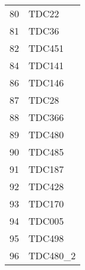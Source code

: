 \begin{table}[ht]
\begin{tabular}{rl}
   80 & TDC22 \\ 
   81 & TDC36 \\ 
   82 & TDC451 \\ 
   84 & TDC141 \\ 
   86 & TDC146 \\ 
   87 & TDC28 \\ 
   88 & TDC366 \\ 
   89 & TDC480 \\ 
   90 & TDC485 \\ 
   91 & TDC187 \\ 
   92 & TDC428 \\ 
   93 & TDC170 \\ 
   94 & TDC005 \\ 
   95 & TDC498 \\ 
   96 & TDC480\_2 \\ 
   \hline
\end{tabular}
\end{table}
